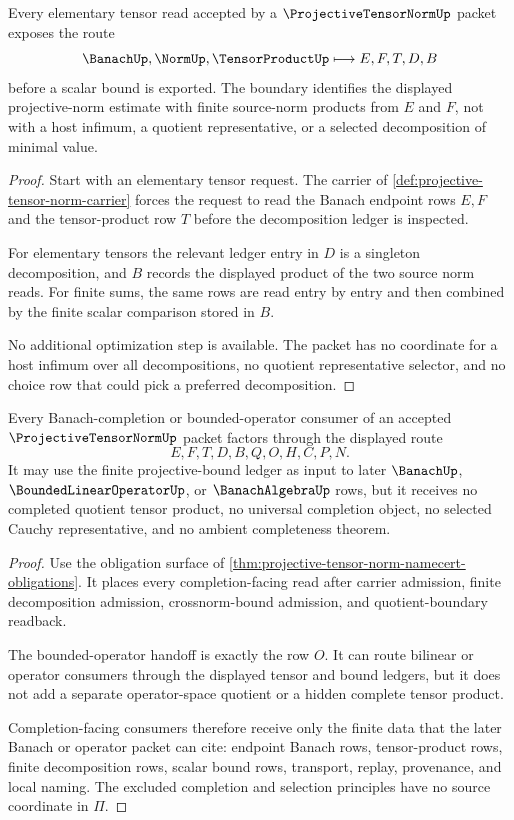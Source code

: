 \begin{theorem}
\label{thm:tensor-norm-crossnorm-boundary}
Every elementary tensor read accepted by a $\ProjectiveTensorNormUp$ packet exposes the route
$$
\BanachUp,\NormUp,\TensorProductUp
\longmapsto
E,F,T,D,B
$$
before a scalar bound is exported. The boundary identifies the displayed projective-norm estimate with finite source-norm products from $E$ and $F$, not with a host infimum, a quotient representative, or a selected decomposition of minimal value.
\end{theorem}
\begin{proof}
Start with an elementary tensor request. The carrier of \autoref{def:projective-tensor-norm-carrier} forces the request to read the Banach endpoint rows $E,F$ and the tensor-product row $T$ before the decomposition ledger is inspected.

For elementary tensors the relevant ledger entry in $D$ is a singleton decomposition, and $B$ records the displayed product of the two source norm reads. For finite sums, the same rows are read entry by entry and then combined by the finite scalar comparison stored in $B$.

No additional optimization step is available. The packet has no coordinate for a host infimum over all decompositions, no quotient representative selector, and no choice row that could pick a preferred decomposition.
\end{proof}

\begin{theorem}
\label{thm:tensor-norm-banach-completion-handoff}
Every Banach-completion or bounded-operator consumer of an accepted $\ProjectiveTensorNormUp$ packet factors through the displayed route
$$
E,F,T,D,B,Q,O,H,C,P,N .
$$
It may use the finite projective-bound ledger as input to later $\BanachUp$, $\BoundedLinearOperatorUp$, or $\BanachAlgebraUp$ rows, but it receives no completed quotient tensor product, no universal completion object, no selected Cauchy representative, and no ambient completeness theorem.
\end{theorem}
\begin{proof}
Use the obligation surface of \autoref{thm:projective-tensor-norm-namecert-obligations}. It places every completion-facing read after carrier admission, finite decomposition admission, crossnorm-bound admission, and quotient-boundary readback.

The bounded-operator handoff is exactly the row $O$. It can route bilinear or operator consumers through the displayed tensor and bound ledgers, but it does not add a separate operator-space quotient or a hidden complete tensor product.

Completion-facing consumers therefore receive only the finite data that the later Banach or operator packet can cite: endpoint Banach rows, tensor-product rows, finite decomposition rows, scalar bound rows, transport, replay, provenance, and local naming. The excluded completion and selection principles have no source coordinate in $\Pi$.
\end{proof}

